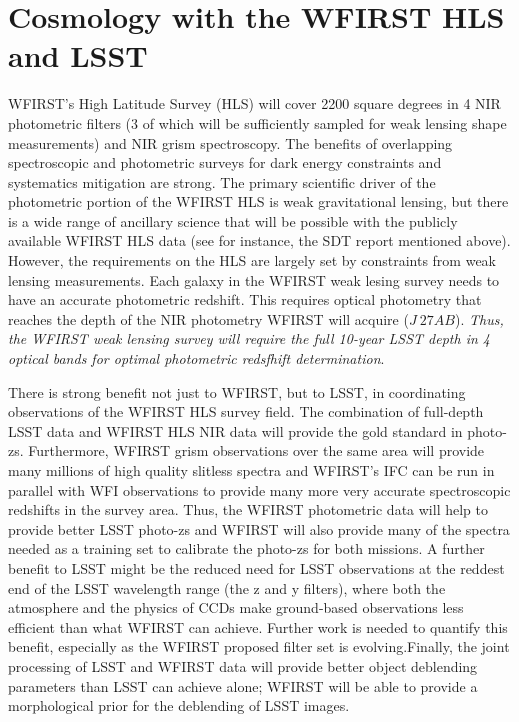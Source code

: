%
%
%
%

\section{Cosmology with the WFIRST HLS and LSST}
\def\secname{\chpname:weaklensing}\label{sec:\secname}



WFIRST's High Latitude Survey (HLS) will cover
2200 square degrees in 4 NIR photometric filters
(3 of which will be sufficiently sampled for weak lensing shape
measurements) and NIR grism spectroscopy.  The benefits of overlapping
spectroscopic and photometric surveys for dark energy constraints and
systematics mitigation are strong.  The primary scientific driver of the
photometric portion of the WFIRST HLS is weak gravitational lensing,
but there is a wide range of ancillary science that will be possible
with the publicly available WFIRST HLS data (see for instance, the SDT
report mentioned above).  However, the requirements on the HLS are
largely set by constraints from weak lensing measurements.  Each galaxy
in the WFIRST weak lesing survey needs to have an accurate photometric
redshift.  This requires optical photometry that reaches the depth of
the NIR photometry WFIRST will acquire ($J~27AB$).  \emph{Thus, the
WFIRST weak lensing survey will require the full  10-year LSST depth in
4 optical bands for optimal photometric redsfhift determination}.

There is strong benefit not just to WFIRST, but to LSST, in coordinating
observations of the WFIRST HLS survey field. The combination of
full-depth LSST data and WFIRST HLS NIR data will provide the gold
standard in photo-zs.  Furthermore, WFIRST grism observations over the
same area will provide many millions of high quality slitless spectra
and WFIRST's IFC can be run in parallel with WFI observations to provide
many more very accurate spectroscopic redshifts in the survey area.
Thus, the WFIRST photometric data will help to provide better LSST
photo-zs and  WFIRST will also provide many of the spectra needed as a
training set to calibrate the photo-zs for both missions.  A further
benefit to LSST might be the reduced need for LSST observations at the
reddest end of the LSST wavelength range (the z and y filters), where
both the atmosphere and the physics of CCDs make ground-based
observations less efficient than what WFIRST can achieve. Further work is needed to quantify this benefit, especially as the WFIRST proposed filter set is evolving.Finally, the
joint processing of LSST and WFIRST data will provide better object
deblending parameters than LSST can achieve alone; WFIRST will be able
to provide a morphological prior for the deblending of LSST images.

